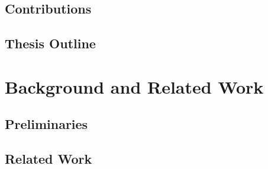 \documentclass[11pt,a4paper,oneside]{report}
\begin{document}
\section{Contributions}

\section{Thesis Outline}

\chapter{Background and Related Work}
\label{ch:background}


\section{Preliminaries}

\section{Related Work}

\end{document}
